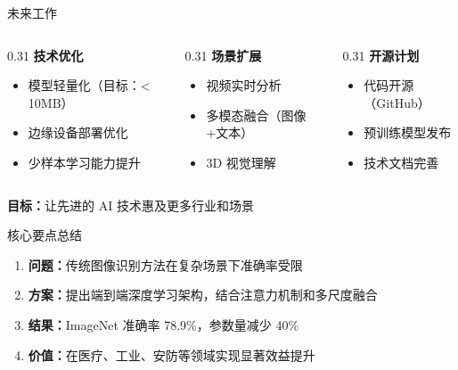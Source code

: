 \documentclass[aspectratio=169,11pt]{beamer}
\begin{document}
\begin{frame}{未来工作}
    \begin{columns}[T]
        \begin{column}{0.31\textwidth}
            \textbf{技术优化}
            \begin{itemize}
                \item 模型轻量化（目标：< 10MB）
                \item 边缘设备部署优化
                \item 少样本学习能力提升
            \end{itemize}
        \end{column}
        \begin{column}{0.31\textwidth}
            \textbf{场景扩展}
            \begin{itemize}
                \item 视频实时分析
                \item 多模态融合（图像+文本）
                \item 3D 视觉理解
            \end{itemize}
        \end{column}
        \begin{column}{0.31\textwidth}
            \textbf{开源计划}
            \begin{itemize}
                \item 代码开源（GitHub）
                \item 预训练模型发布
                \item 技术文档完善
            \end{itemize}
        \end{column}
    \end{columns}
    
    \vspace{1.5em}
    \centering
    \textbf{目标：}让先进的 AI 技术惠及更多行业和场景
\end{frame}

\begin{frame}{核心要点总结}
    \begin{enumerate}
        \item \textbf{问题：}传统图像识别方法在复杂场景下准确率受限
        \item \textbf{方案：}提出端到端深度学习架构，结合注意力机制和多尺度融合
        \item \textbf{结果：}ImageNet 准确率 78.9\%，参数量减少 40\%
        \item \textbf{价值：}在医疗、工业、安防等领域实现显著效益提升
    \end{enumerate}
    
    \vspace{1.5em}
    \centering
\end{frame}
\end{document}
